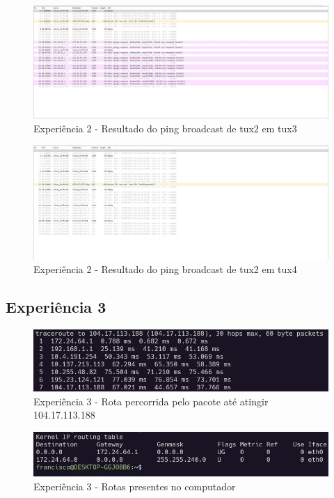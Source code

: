 \begin{figure}[H]
\centering
  \includegraphics[width=\linewidth]{img/exp2-tsk10-tux2-full.jpg}
  \caption{Experiência 2 - Resultado do ping broadcast de tux2 em tux3}
\end{figure}

\begin{figure}[H]
\centering
  \includegraphics[width=\linewidth]{img/exp2-tsk10-tux4-full.jpg}
  \caption{Experiência 2 - Resultado do ping broadcast de tux2 em tux4}
\end{figure}


\subsection{Experiência 3}

\begin{figure}[H]
\centering
  \includegraphics[width=\linewidth]{img/exp3-traceroute.jpg}
  \caption{Experiência 3 - Rota percorrida pelo pacote até atingir 104.17.113.188}
\end{figure}

\begin{figure}[H]
\centering
  \includegraphics[width=\linewidth]{img/exp3-routes.jpg}
  \caption{Experiência 3 - Rotas presentes no computador}
\end{figure}

